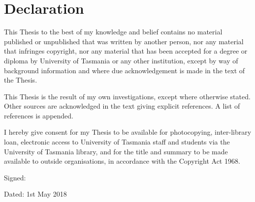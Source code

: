 \chapter{Declaration}

This Thesis to the best of my knowledge and belief contains no material published or unpublished that was written by another person, nor any material that infringes copyright, nor any material that has been accepted for a degree or diploma by University of Tasmania or any other institution, except by way of background information and where due acknowledgement is made in the text of the Thesis.

This Thesis is the result of my own investigations, except where otherwise stated. Other sources are acknowledged in the text giving explicit references. A list of references is appended.


I hereby give consent for my Thesis to be available for photocopying, inter-library loan, electronic access to University of Tasmania staff and students via the University of Tasmania library, and for the title and summary to be made available to outside organisations, in accordance with the Copyright Act 1968.


   \bigskip
   \bigskip

Signed:

   \bigskip
   \bigskip

Dated: 1st May 2018      %
